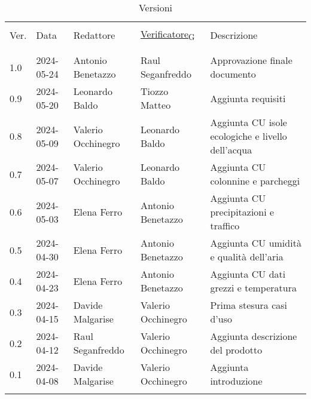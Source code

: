 \documentclass[12pt]{article}
\begin{document}


\newpage



\captionsetup[table]{list=no}
\begin{table}[!h]
	\footnotesize
	\begin{center}
		\caption*{Versioni}
		\vspace{0.5cm}
		\begin{tabular}{ l l l l p{6.1cm} }
			\hline                                                                                                          \\[-2ex]
			Ver. & Data & Redattore & \href{https://7last.github.io/docs/rtb/documentazione-interna/glossario\#verificatore}{Verificatore\textsubscript{G}} & Descrizione\\
			\\[-2ex] \hline \\[-1.5ex]
			1.0 & 2024-05-24 & Antonio Benetazzo & Raul Seganfreddo & Approvazione finale documento\\
			0.9 & 2024-05-20 & Leonardo Baldo & Tiozzo Matteo & Aggiunta requisiti\\
			0.8 & 2024-05-09 & Valerio Occhinegro & Leonardo Baldo & Aggiunta CU isole ecologiche e livello dell'acqua \\
			0.7 & 2024-05-07 & Valerio Occhinegro & Leonardo Baldo & Aggiunta CU colonnine e parcheggi\\
			0.6 & 2024-05-03 & Elena Ferro & Antonio Benetazzo & Aggiunta CU precipitazioni e traffico\\
			0.5 & 2024-04-30 & Elena Ferro & Antonio Benetazzo & Aggiunta CU umidità e qualità dell'aria\\
			0.4 & 2024-04-23 & Elena Ferro & Antonio Benetazzo & Aggiunta CU dati grezzi e temperatura\\
			0.3 & 2024-04-15 & Davide Malgarise & Valerio Occhinegro & Prima stesura casi d'uso\\
			0.2 & 2024-04-12 & Raul Seganfreddo & Valerio Occhinegro & Aggiunta descrizione del prodotto \\
			0.1 & 2024-04-08 & Davide Malgarise & Valerio Occhinegro & Aggiunta introduzione \\
			\\[-1.5ex] \hline
		\end{tabular}
	\end{center}
\end{table}
\captionsetup[table]{list=yes}

\newpage

\tableofcontents
\listoftables
\listoffigures

\newpage



\newpage



\newpage



\newpage


\end{document}
